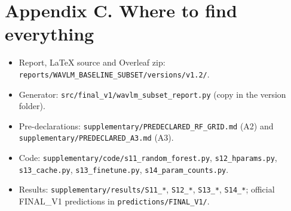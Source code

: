 \documentclass[11pt,a4paper]{article}
\begin{document}
\section*{Appendix C. Where to find everything}
\begin{itemize}\item Report, LaTeX source and Overleaf zip: \texttt{reports/WAVLM\_\allowbreak{}BASELINE\_\allowbreak{}SUBSET/versions/v1.2/}.
\item Generator: \texttt{src/final\_\allowbreak{}v1/wavlm\_\allowbreak{}subset\_\allowbreak{}report.py} (copy in the version folder).
\item Pre-declarations: \texttt{supplementary/PREDECLARED\_\allowbreak{}RF\_\allowbreak{}GRID.md} (A2) and \texttt{supplementary/PREDECLARED\_\allowbreak{}A3.md} (A3).
\item Code: \texttt{supplementary/code/s11\_\allowbreak{}random\_\allowbreak{}forest.py}, \texttt{s12\_\allowbreak{}hparams.py}, \texttt{s13\_\allowbreak{}cache.py}, \texttt{s13\_\allowbreak{}finetune.py}, \texttt{s14\_\allowbreak{}param\_\allowbreak{}counts.py}.
\item Results: \texttt{supplementary/results/S11\_\allowbreak{}*}, \texttt{S12\_\allowbreak{}*}, \texttt{S13\_\allowbreak{}*}, \texttt{S14\_\allowbreak{}*}; official FINAL\_V1 predictions in \texttt{predictions/FINAL\_\allowbreak{}V1/}.
\end{itemize}
\end{document}
